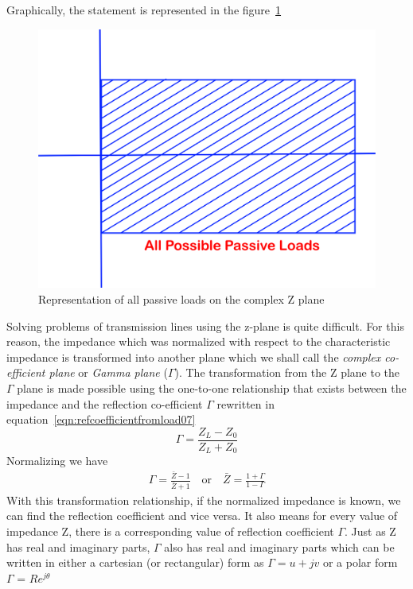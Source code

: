 Graphically, the statement is represented in the figure~\ref{fig:oigvbnkliu}
\begin{figure}[h]
\centering
\includegraphics[width=0.6\linewidth]{./graphics/oigvbnkliu}
\caption{Representation of all passive loads on the complex Z plane}
\label{fig:oigvbnkliu}
\end{figure}

Solving problems of transmission lines using the z-plane is quite difficult. For this reason, the impedance which was normalized with respect to the characteristic impedance is transformed into another plane which we shall call the \emph{complex co-efficient plane} or \emph{Gamma plane} ($\Gamma$).
The transformation from the Z plane to the $\Gamma$ plane is made possible using the one-to-one relationship that exists between the impedance and the reflection co-efficient $\Gamma$ rewritten in equation~\eqref{eqn:refcoefficientfromload07}
\begin{equation}
\Gamma = \frac{Z_L - Z_0}{Z_L + Z_0}\label{eqn:refcoefficientfromload07}
\end{equation}
Normalizing we have
\begin{align*}
\Gamma= \frac{\bar{Z} - 1}{\bar{Z} + 1}\quad\text{or}\quad\bar{Z}= \frac{1 + \Gamma}{1 - \Gamma}
\end{align*}
With this transformation relationship, if the normalized impedance is known, we can find the reflection coefficient and vice versa. It also means for every value of impedance Z, there is a corresponding value of reflection coefficient $ \Gamma$. Just as Z has real and imaginary parts, $\Gamma$ also has real and imaginary parts which can be written in either a cartesian (or rectangular) form as $\Gamma=u+jv$ or a polar form $\Gamma$ = $Re^{j\theta}$

